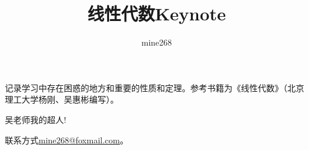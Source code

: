 \documentclass[10pt,b5paper,openany]{book}
\title{线性代数Keynote}
\author{mine268}
\begin{document}
	\maketitle

	记录学习中存在困惑的地方和重要的性质和定理。参考书籍为《线性代数》（北京理工大学杨刚、吴惠彬编写）。

	吴老师我的超人!

	联系方式\href{mailto:mine268@foxmail.com}{mine268@foxmail.com}。

	
	

	
\end{document}
